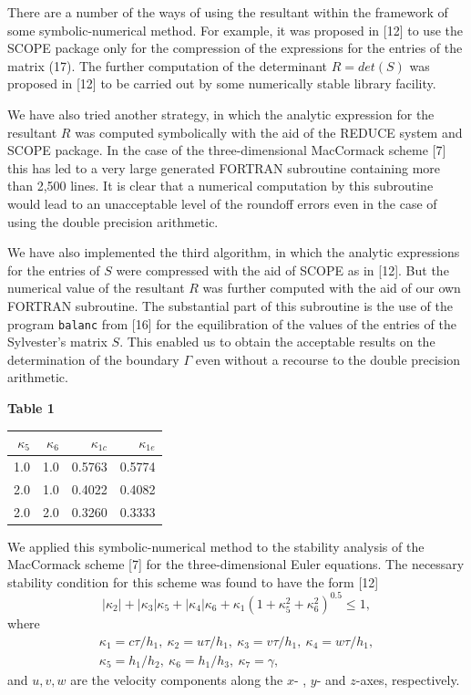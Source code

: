    There are a number of the ways of using the resultant within the framework
of some symbolic-numerical method. For example, it was proposed in [12] to use
the SCOPE package only for the compression of the expressions for the entries
of the matrix (17). The further computation of the determinant $R=det(S)$ was
proposed in [12] to be carried out by some numerically stable library facility.

   We have also tried another strategy, in which the analytic expression for
the resultant $R$ was computed symbolically with the aid of the REDUCE system
and SCOPE package. In the case of the three-dimensional MacCormack scheme [7]
this has led to a very large generated FORTRAN subroutine containing more than
2,500 lines. It is clear that a numerical computation by this subroutine would
lead to an unacceptable level of the roundoff errors even in the case of using
the double precision arithmetic.

   We have also implemented the third algorithm, in which the analytic
expressions for the entries of $S$ were compressed with the aid of SCOPE as in
[12]. But the numerical value of the resultant $R$ was further computed with
the aid of our own FORTRAN subroutine. The substantial part of this subroutine
is the use of the program {\tt balanc} from [16] for the equilibration of the
values of the entries of the Sylvester's matrix $S$. This enabled us to obtain
the acceptable results on the determination of the boundary $\Gamma$ even
without a recourse to the double precision arithmetic.
\begin{center}
{\bf Table 1}
\end{center}
\begin{center}
\begin{tabular}{|rrrr|}
\hline
$\kappa_5$ & $\kappa_6$ & $\kappa_{1c}$ & $\kappa_{1e}$\\
\hline
1.0 & 1.0 & 0.5763 & 0.5774\\
\hline
2.0 & 1.0 & 0.4022 & 0.4082\\
\hline
2.0 & 2.0 & 0.3260 & 0.3333\\
\hline
\end{tabular}
\end{center}

\vspace*{5mm}

   We applied this symbolic-numerical method to the stability analysis of the
MacCormack scheme [7] for the three-dimensional Euler equations. The
necessary stability condition for this scheme was found to have the form [12]
\begin{equation}
|\kappa_2|+|\kappa_3|\kappa_5+|\kappa_4|\kappa_6+\kappa_1(1+\kappa_5^2+
\kappa_6^2)^{0.5}\leq 1,
\end{equation}
where
\begin{eqnarray}
\kappa_1=c\tau/h_1,~\kappa_2=u\tau/h_1,~\kappa_3=v\tau/h_1,~\kappa_4=w\tau/h_1,
\nonumber\\
\kappa_5=h_1/h_2,~\kappa_6=h_1/h_3, ~\kappa_7=\gamma,
\end{eqnarray}
and $u,v,w$ are the velocity components along the $x$- , $y$- and $z$-axes,
respectively.

